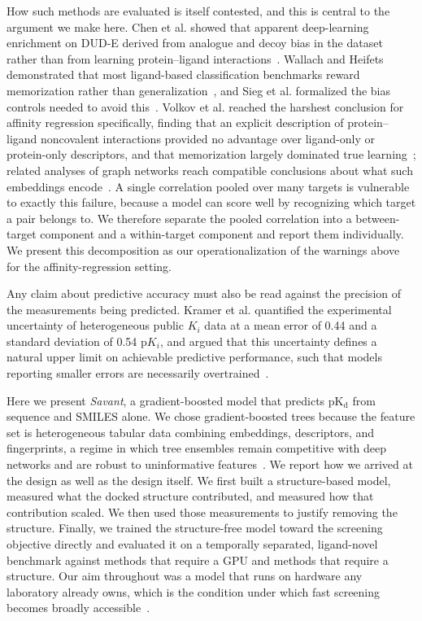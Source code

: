 \documentclass[times, twoside]{zHenriquesLab-StyleBioRxiv}
\newcommand{\savant}{\textit{Savant}\xspace}
\newcommand{\pl}{protein--ligand\xspace}
\newcommand{\pkd}{\ensuremath{\mathrm{pK_d}}\xspace}
\begin{document}
How such methods are evaluated is itself contested, and this is central to the argument we make here. Chen et al. showed that apparent deep-learning enrichment on DUD-E derived from analogue and decoy bias in the dataset rather than from learning \pl interactions~\cite{chen2019dude}. Wallach and Heifets demonstrated that most ligand-based classification benchmarks reward memorization rather than generalization~\cite{wallach2018memorization}, and Sieg et al. formalized the bias controls needed to avoid this~\cite{sieg2019bias}. Volkov et al. reached the harshest conclusion for affinity regression specifically, finding that an explicit description of \pl noncovalent interactions provided no advantage over ligand-only or protein-only descriptors, and that memorization largely dominated true learning~\cite{volkov2022frustration}; related analyses of graph networks reach compatible conclusions about what such embeddings encode~\cite{mastropietro2023gnn}. A single correlation pooled over many targets is vulnerable to exactly this failure, because a model can score well by recognizing which target a pair belongs to. We therefore separate the pooled correlation into a between-target component and a within-target component and report them individually. We present this decomposition as our operationalization of the warnings above for the affinity-regression setting.

Any claim about predictive accuracy must also be read against the precision of the measurements being predicted. Kramer et al. quantified the experimental uncertainty of heterogeneous public $K_i$ data at a mean error of 0.44 and a standard deviation of 0.54 $\mathrm{p}K_i$, and argued that this uncertainty defines a natural upper limit on achievable predictive performance, such that models reporting smaller errors are necessarily overtrained~\cite{kramer2012uncertainty}.

Here we present \savant, a gradient-boosted model that predicts \pkd from sequence and SMILES alone. We chose gradient-boosted trees because the feature set is heterogeneous tabular data combining embeddings, descriptors, and fingerprints, a regime in which tree ensembles remain competitive with deep networks and are robust to uninformative features~\cite{chen2016xgboost,grinsztajn2022tabular,shwartzziv2022tabular}. We report how we arrived at the design as well as the design itself. We first built a structure-based model, measured what the docked structure contributed, and measured how that contribution scaled. We then used those measurements to justify removing the structure. Finally, we trained the structure-free model toward the screening objective directly and evaluated it on a temporally separated, ligand-novel benchmark against methods that require a GPU and methods that require a structure. Our aim throughout was a model that runs on hardware any laboratory already owns, which is the condition under which fast screening becomes broadly accessible~\cite{sadybekov2023computational}.
\end{document}
